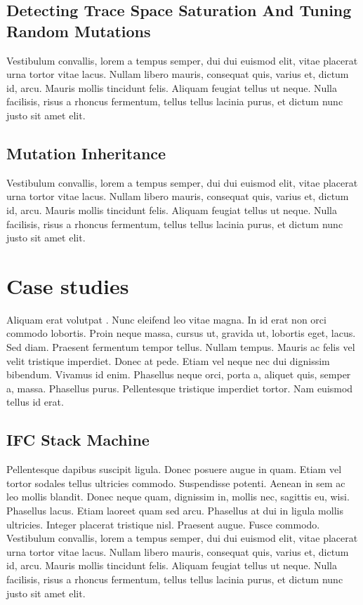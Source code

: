 \documentclass[acmsmall, anonymous]{acmart}
\begin{document}
\subsection{Detecting Trace Space Saturation And Tuning Random Mutations}

Vestibulum convallis, lorem a tempus semper, dui dui euismod elit, vitae
placerat urna tortor vitae lacus. Nullam libero mauris, consequat quis, varius
et, dictum id, arcu. Mauris mollis tincidunt felis. Aliquam feugiat tellus ut
neque. Nulla facilisis, risus a rhoncus fermentum, tellus tellus lacinia purus,
et dictum nunc justo sit amet elit.

\subsection{Mutation Inheritance}

Vestibulum convallis, lorem a tempus semper, dui dui euismod elit,
vitae placerat urna tortor vitae lacus. Nullam libero mauris, consequat quis,
varius et, dictum id, arcu. Mauris mollis tincidunt felis. Aliquam feugiat
tellus ut neque. Nulla facilisis, risus a rhoncus fermentum, tellus tellus
lacinia purus, et dictum nunc justo sit amet elit.

\section{Case studies}
\label{sec:casestudies}

Aliquam erat volutpat \citep{devai2013edsl}. Nunc eleifend leo vitae magna. In id
erat non orci commodo lobortis. Proin neque massa, cursus ut, gravida ut,
lobortis eget, lacus. Sed diam. Praesent fermentum tempor tellus. Nullam tempus.
Mauris ac felis vel velit tristique imperdiet. Donec at pede. Etiam vel neque
nec dui dignissim bibendum. Vivamus id enim. Phasellus neque orci, porta a,
aliquet quis, semper a, massa. Phasellus purus. Pellentesque tristique imperdiet
tortor. Nam euismod tellus id erat.

\subsection{IFC Stack Machine}

Pellentesque dapibus suscipit ligula. Donec posuere augue in quam. Etiam vel
tortor sodales tellus ultricies commodo. Suspendisse potenti. Aenean in sem ac
leo mollis blandit. Donec neque quam, dignissim in, mollis nec, sagittis eu,
wisi. Phasellus lacus. Etiam laoreet quam sed arcu. Phasellus at dui in ligula
mollis ultricies. Integer placerat tristique nisl. Praesent augue. Fusce
commodo. Vestibulum convallis, lorem a tempus semper, dui dui euismod elit,
vitae placerat urna tortor vitae lacus. Nullam libero mauris, consequat quis,
varius et, dictum id, arcu. Mauris mollis tincidunt felis. Aliquam feugiat
tellus ut neque. Nulla facilisis, risus a rhoncus fermentum, tellus tellus
lacinia purus, et dictum nunc justo sit amet elit.
\end{document}
